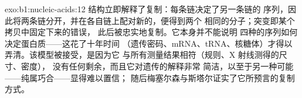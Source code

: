 \begin{solution}{exo:b1:nucleic-acids:12}
结构立即解释了复制：每条链决定了另一条链的
序列，因此将两条链分开，并在各自链上配对新的，便得到两个
相同的分子；突变即某个拷贝中固定下来的错误，
此后被忠实地复制。它本身并不能说明
四种的序列如何决定蛋白质——这花了十年时间
（遗传密码、mRNA、tRNA、核糖体）才得以弄清。该模型被接受，是因为它
与所有测量结果相符（规则、X 射线测得的尺寸、密度），
没有任何剩余，而且它对遗传的解释非常
简洁，以至于另一种可能——纯属巧合——显得难以置信；
随后梅塞尔森与斯塔尔证实了它所预言的复制方式。
\end{solution}

